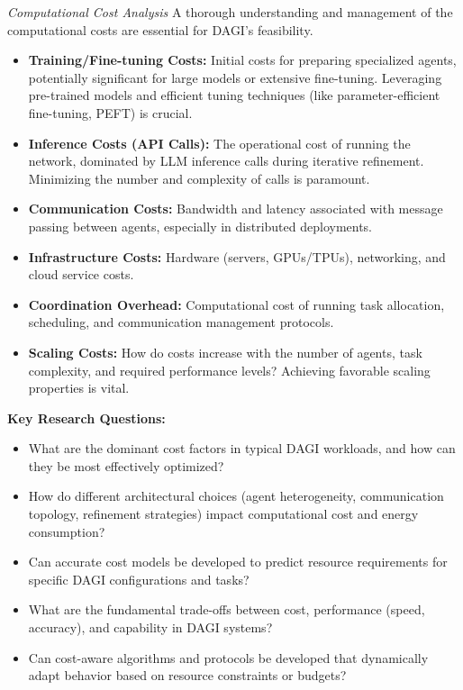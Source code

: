 \documentclass[12pt]{amsart}
\begin{document}
\textit{Computational Cost Analysis}
\label{subsec:cost_analysis}
A thorough understanding and management of the computational costs are essential for DAGI's feasibility.
\begin{itemize}[leftmargin=*]
    \item \textbf{Training/Fine-tuning Costs:} Initial costs for preparing specialized agents, potentially significant for large models or extensive fine-tuning. Leveraging pre-trained models and efficient tuning techniques (like parameter-efficient fine-tuning, PEFT) is crucial.
    \item \textbf{Inference Costs (API Calls):} The operational cost of running the network, dominated by LLM inference calls during iterative refinement. Minimizing the number and complexity of calls is paramount.
    \item \textbf{Communication Costs:} Bandwidth and latency associated with message passing between agents, especially in distributed deployments.
    \item \textbf{Infrastructure Costs:} Hardware (servers, GPUs/TPUs), networking, and cloud service costs.
    \item \textbf{Coordination Overhead:} Computational cost of running task allocation, scheduling, and communication management protocols.
    \item \textbf{Scaling Costs:} How do costs increase with the number of agents, task complexity, and required performance levels? Achieving favorable scaling properties is vital.
\end{itemize}
\textbf{Key Research Questions:}
\begin{itemize}[leftmargin=*, label={--}]
    \item What are the dominant cost factors in typical DAGI workloads, and how can they be most effectively optimized?
    \item How do different architectural choices (agent heterogeneity, communication topology, refinement strategies) impact computational cost and energy consumption?
    \item Can accurate cost models be developed to predict resource requirements for specific DAGI configurations and tasks?
    \item What are the fundamental trade-offs between cost, performance (speed, accuracy), and capability in DAGI systems?
    \item Can cost-aware algorithms and protocols be developed that dynamically adapt behavior based on resource constraints or budgets?
\end{itemize}
\end{document}
